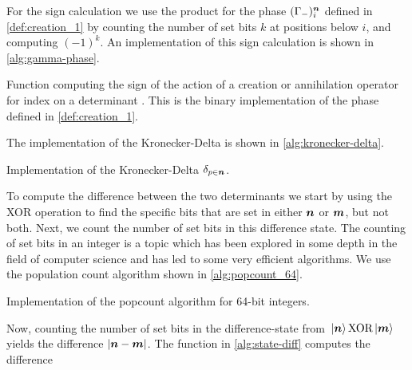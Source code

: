             For the sign calculation we use the product for the phase
            $(\Gamma_{-})^{\boldsymbol{n}}_i$ defined in \autoref{def:creation_1} by
            counting the number of set bits $k$ at positions below $i$, and
            computing $(-1)^k$.
            An implementation of this sign calculation is shown in
            \autoref{alg:gamma-phase}.
            \begin{algorithm}
                \caption{Function computing the sign of the action of a creation
                or annihilation operator for index  on a determinant
                .
                This is the binary implementation of the phase defined in
                \autoref{def:creation_1}.}
                \label{alg:gamma-phase}
            \end{algorithm}
            The implementation of the Kronecker-Delta is shown in
            \autoref{alg:kronecker-delta}.
            \begin{algorithm}
                \caption{Implementation of the Kronecker-Delta $\delta_{p \in
                \boldsymbol{n}}$.}
                \label{alg:kronecker-delta}
            \end{algorithm}
            To compute the difference between the two determinants we start by
            using the XOR operation to find the specific bits that are set in
            either $\boldsymbol{n}$ or $\boldsymbol{m}$, but not both.
            Next, we count the number of set bits in this difference state.
            The counting of set bits in an integer is a topic which has been
            explored in some depth in the field of computer science and has led
            to some very efficient algorithms.
            We use the population count algorithm \cite{popcount} shown in
            \autoref{alg:popcount_64}.
            \begin{algorithm}
                \caption{Implementation of the popcount algorithm for 64-bit
                integers.}
                \label{alg:popcount_64}
            \end{algorithm}
            Now, counting the number of set bits in the difference-state from
            $\ket*{\boldsymbol{n}} \text{XOR} \ket*{\boldsymbol{m}}$ yields the difference
            $\abs{\boldsymbol{n} - \boldsymbol{m}}$.
            The function in \autoref{alg:state-diff} computes the difference
